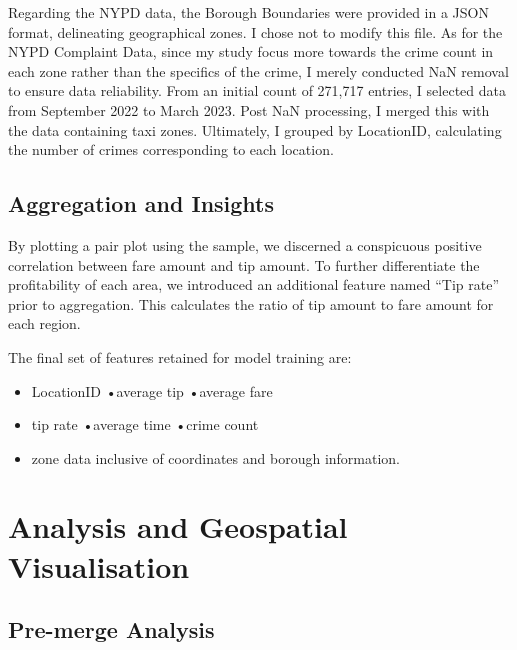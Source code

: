 \documentclass[11pt]{article}
\begin{document}
Regarding the NYPD data, the Borough Boundaries were provided in a JSON format, delineating geographical zones. I chose not to modify this file. As for the NYPD Complaint Data, since my study focus more towards the crime count in each zone rather than the specifics of the crime, I merely conducted NaN removal to ensure data reliability. From an initial count of 271,717 entries, I selected data from September 2022 to March 2023. Post NaN processing, I merged this with the data containing taxi zones. Ultimately, I grouped by LocationID, calculating the number of crimes corresponding to each location.

\subsection{Aggregation and Insights}

By plotting a pair plot using the sample, we discerned a conspicuous positive correlation between fare amount and tip amount. To further differentiate the profitability of each area, we introduced an additional feature named “Tip rate” prior to aggregation. This calculates the ratio of tip amount to fare amount for each region.

The final set of features retained for model training are: 
\begin{itemize} 
    \item LocationID \quad\quad\quad •average tip  \quad\quad\quad•average fare
    \item tip rate \quad\quad\quad\quad •average time \quad\quad\quad •crime count
    \item zone data inclusive of coordinates and borough information.
\end{itemize}



\section{Analysis and Geospatial Visualisation}
\subsection{Pre-merge Analysis}
\end{document}
